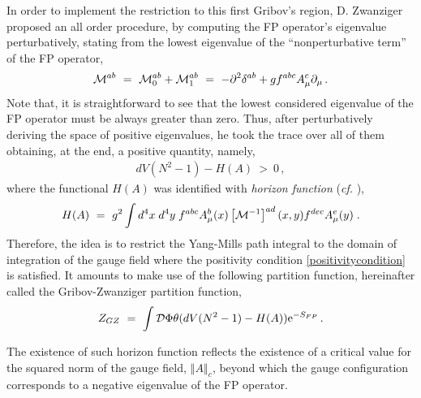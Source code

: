 In order to implement the restriction to this first Gribov's region, D. Zwanziger proposed an
all order procedure, by computing the FP operator's eigenvalue perturbatively, stating from the
lowest eigenvalue of the ``nonperturbative term'' of the FP operator,
\begin{eqnarray}
{\cal M}^{ab} ~=~ {\cal M}_{0}^{ab} + {\cal M}_{1}^{ab} ~=~ -\partial^{2}\delta^{ab} +
gf^{abc}A^{c}_{\mu}\partial_{\mu}\,.
\end{eqnarray}
Note that, it is straightforward to see that the lowest considered eigenvalue of the FP
operator must be always greater than zero. Thus, after perturbatively deriving the space of
positive eigenvalues, he took the trace over all of them obtaining, at the end, a positive
quantity, namely,
\begin{eqnarray}
dV(N^{2}-1) - H(A) ~>~ 0\,,
\label{positivitycondition}
\end{eqnarray}
where the functional $H(A)$ was identified with {\it horizon function} ({\it cf.}
\cite{Vandersickel:2012tz,Zwanziger:1982na,Zwanziger:1988jt,Zwanziger:1989mf}),
\begin{align}
H(A)  ~=~  {g^{2}}\int d^{4}x\;d^{4}y\; f^{abc}A_{\mu}^{b}(x)\left[ {\cal M}^{-1}\right]^{ad}
(x,y)f^{dec}A_{\mu}^{e}(y)   \;.
\label{hf2}
\end{align}
Therefore, the idea is to restrict the Yang-Mills path integral to the domain of integration of
the gauge field where the positivity condition \eqref{positivitycondition} is satisfied. It
amounts to make use of the following partition function, hereinafter called the
Gribov-Zwanziger partition function,
\begin{eqnarray}
Z_{GZ} ~=~ \int {\cal D} \Phi \theta (dV(N^{2}-1) - H(A))\mathrm{e}^{-S_{FP}}\,.
\label{gzpartition1}
\end{eqnarray}

The existence of such horizon function reflects the existence of a critical value for the
squared norm of the gauge field, $\left\Vert A \right\Vert_{c}$, beyond which the gauge
configuration corresponds to a negative eigenvalue of the FP operator.

